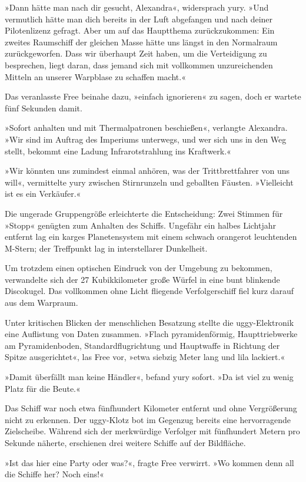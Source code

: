 »Dann hätte man nach dir gesucht, Alexandra«, widersprach yury. »Und vermutlich hätte man dich bereits in der Luft abgefangen und nach deiner Pilotenlizenz gefragt. Aber um auf das Hauptthema zurückzukommen: Ein zweites Raumschiff der gleichen Masse hätte uns längst in den Normalraum zurückgeworfen. Dass wir überhaupt Zeit haben, um die Verteidigung zu besprechen, liegt daran, dass jemand sich mit vollkommen unzureichenden Mitteln an unserer Warpblase zu schaffen macht.«

Das veranlasste Free beinahe dazu, »einfach ignorieren« zu sagen, doch er wartete fünf Sekunden damit.

»Sofort anhalten und mit Thermalpatronen beschießen«, verlangte Alexandra. »Wir sind im Auftrag des Imperiums unterwegs, und wer sich uns in den Weg stellt, bekommt eine Ladung Infrarotstrahlung ins Kraftwerk.«

»Wir könnten uns zumindest einmal anhören, was der Trittbrettfahrer von uns will«, vermittelte yury zwischen Stirnrunzeln und geballten Fäusten. »Vielleicht ist es ein Verkäufer.«

Die ungerade Gruppengröße erleichterte die Entscheidung: Zwei Stimmen für »Stopp« genügten zum Anhalten des Schiffs. Ungefähr ein halbes Lichtjahr entfernt lag ein karges Planetensystem mit einem schwach orangerot leuchtenden M-Stern; der Treffpunkt lag in interstellarer Dunkelheit.

Um trotzdem einen optischen Eindruck von der Umgebung zu bekommen, verwandelte sich der 27 Kubikkilometer große Würfel in eine bunt blinkende Discokugel. Das vollkommen ohne Licht fliegende Verfolgerschiff fiel kurz darauf aus dem Warpraum.

Unter kritischen Blicken der menschlichen Besatzung stellte die uggy-Elektronik eine Auflistung von Daten zusammen. »Flach pyramidenförmig, Haupttriebwerke am Pyramidenboden, Standardflugrichtung und Hauptwaffe in Richtung der Spitze ausgerichtet«, las Free vor, »etwa siebzig Meter lang und lila lackiert.«

»Damit überfällt man keine Händler«, befand yury sofort. »Da ist viel zu wenig Platz für die Beute.«

Das Schiff war noch etwa fünfhundert Kilometer entfernt und ohne Vergrößerung nicht zu erkennen. Der uggy-Klotz bot im Gegenzug bereits eine hervorragende Zielscheibe. Während sich der merkwürdige Verfolger mit fünfhundert Metern pro Sekunde näherte, erschienen drei weitere Schiffe auf der Bildfläche.

»Ist das hier eine Party oder was?«, fragte Free verwirrt. »Wo kommen denn all die Schiffe her? Noch eins!«

